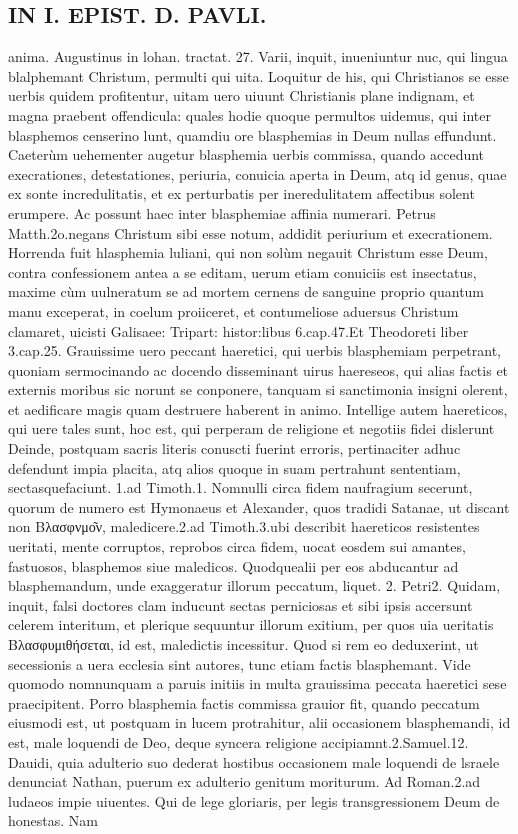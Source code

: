 \documentclass{article}
\begin{document}
\begin{pages}
\section*{IN I. EPIST. D. PAVLI. }
\marginpar{[ p.37 ]}\pstart anima. Augustinus in lohan. tractat. 27. Varii, inquit, inueniuntur nuc, qui lingua blalphemant Christum, permulti qui uita. Loquitur de his, qui Christianos se esse uerbis quidem profitentur, uitam uero uiuunt Christianis plane indignam, et magna praebent offendicula: quales hodie quoque  permultos uidemus, qui inter blasphemos censerino lunt, quamdiu ore blasphemias in Deum nullas effundunt. Caeterùm uehementer augetur blasphemia uerbis commissa, quando accedunt execrationes, detestationes, periuria, conuicia aperta in Deum, atq id genus, quae ex sonte incredulitatis, et ex perturbatis per ineredulitatem affectibus solent erumpere. Ac possunt haec inter blasphemiae affinia numerari. Petrus Matth.2o.negans Christum sibi esse notum, addidit periurium et execrationem. Horrenda fuit hlasphemia luliani, qui non solùm negauit Christum esse Deum, contra confessionem antea a se editam, uerum etiam conuiciis est insectatus, maxime cùm uulneratum se ad mortem cernens de sanguine proprio quantum manu exceperat, in coelum proiiceret, et contumeliose aduersus Christum clamaret, uicisti Galisaee: Tripart: histor:libus 6.cap.47.Et Theodoreti liber 3.cap.25. Grauissime uero peccant haeretici, qui uerbis blasphemiam perpetrant, quoniam sermocinando ac docendo disseminant uirus haereseos, qui alias factis et externis moribus sic norunt se conponere, tanquam si sanctimonia insigni olerent, et aedificare magis quam destruere haberent in animo. Intellige autem haereticos, qui uere tales sunt, hoc est, qui perperam de religione et negotiis fidei dislerunt Deinde, postquam sacris literis conuscti fuerint erroris, pertinaciter adhuc defendunt impia placita, atq alios quoque  in suam pertrahunt sententiam, sectasquefaciunt. 1.ad Timoth.1. Nomnulli circa fidem naufragium secerunt, quorum de numero est Hymonaeus et Alexander, quos tradidi Satanae, ut discant non Βλασφνμο͂ν, maledicere.2.ad Timoth.3.ubi describit haereticos resistentes ueritati, mente corruptos, reprobos circa fidem, uocat eosdem sui amantes, fastuosos, blasphemos siue maledicos. Quodquealii per eos abducantur ad blasphemandum, unde exaggeratur illorum   peccatum, liquet. 2. Petri2. Quidam, inquit, falsi doctores clam inducunt sectas perniciosas et sibi ipsis accersunt celerem interitum, et plerique  sequuntur illorum exitium,   per quos uia ueritatis Βλασφυμιθήσεται, id est, maledictis incessitur. Quod si rem eo deduxerint, ut secessionis a uera ecclesia sint autores, tunc etiam factis blasphemant. Vide quomodo nomnunquam a paruis initiis in multa grauissima peccata haeretici sese praecipitent. Porro blasphemia factis commissa grauior fit, quando peccatum eiusmodi est, ut postquam in lucem protrahitur, alii occasionem blasphemandi, id est, male loquendi de Deo, deque  syncera religione accipiamnt.2.Samuel.12. Dauidi, quia adulterio suo dederat hostibus occasionem male loquendi de lsraele denunciat Nathan, puerum ex adulterio genitum moriturum. Ad Roman.2.ad ludaeos impie uiuentes. Qui de lege gloriaris, per legis transgressionem Deum de honestas. Nam 
\end{pages}
\end{document}
